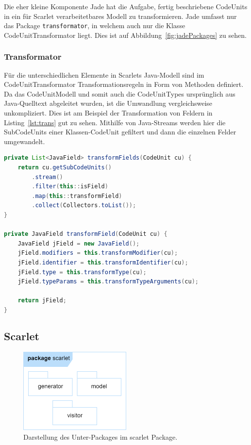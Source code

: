 \documentclass[12pt,oneside,a4paper,parskip]{scrbook}
\begin{document}
Die eher kleine Komponente Jade hat die Aufgabe, fertig beschriebene CodeUnits in ein für Scarlet verarbeitetbares Modell zu transformieren. Jade umfasst nur das Package \texttt{transformator}, in welchem auch nur die Klasse CodeUnitTransformator liegt. Dies ist auf Abbildung~\ref{fig:jadePackages} zu sehen.

\subsubsection{Transformator}

Für die unterschiedlichen Elemente in Scarlets Java-Modell sind im CodeUnitTransformator Transformationsregeln in Form von Methoden definiert. Da das CodeUnitModell und somit auch die CodeUnitTypes ursprünglich aus Java-Quelltext abgeleitet wurden, ist die Umwandlung vergleichsweise unkompliziert. Dies ist am Beispiel der Transformation von Feldern in Listing~\ref{lst:trans} gut zu sehen. Mithilfe von Java-Streams werden hier die SubCodeUnits einer Klassen-CodeUnit gefiltert und dann die einzelnen Felder umgewandelt.
\newpage
\begin{lstlisting}[label=lst:trans,
language=java,
firstnumber=1,
caption=Umwandlung der Felder in den SubCodeUnits einer CodeUnit. Auszug aus der Klasse CodeUnitTransformator.]
private List<JavaField> transformFields(CodeUnit cu) {
	return cu.getSubCodeUnits()
		.stream()
		.filter(this::isField)
		.map(this::transformField)
		.collect(Collectors.toList());
}
	
private JavaField transformField(CodeUnit cu) {
	JavaField jField = new JavaField();
	jField.modifiers = this.transformModifier(cu);
	jField.identifier = this.transformIdentifier(cu);
	jField.type = this.transformType(cu);
	jField.typeParams = this.transformTypeArguments(cu);
	
	return jField;
}
\end{lstlisting}

\subsection{Scarlet}

\begin{figure}[htbp]
	\centering
	\includegraphics[width=0.5\textwidth]{bilder/scarlet}
	\caption{Darstellung des Unter-Packages im scarlet Package.}
	\label{fig:scarletPackages}
\end{figure}
\end{document}
